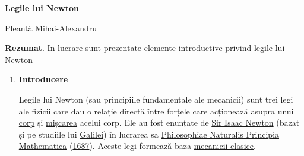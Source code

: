 \documentclass[11pt]{article}
\begin{document}
	
	\begin{center}
	{\large \textbf{Legile lui Newton}}
	\end{center}
	
	
	\begin{center}
	Pleantă Mihai-Alexandru
	\end{center}
	
	
	{\footnotesize \textbf{Rezumat}. In lucrare sunt prezentate elemente introductive privind legile lui Newton}
	
	\begin{enumerate}
		\item \textbf{Introducere}
	
	Legile lui Newton (sau principiile fundamentale ale mecanicii) sunt trei legi ale fizicii care dau o relație directă între forțele care acționează asupra unui \href{https://ro.wikipedia.org/w/index.php?title=Corp_fizic&action=edit&redlink=1}{corp} și \href{https://ro.wikipedia.org/wiki/Mi\%C8\%99care}{mișcarea} acelui corp. Ele au fost enunțate de \href{https://ro.wikipedia.org/wiki/Isaac_Newton}{Sir Isaac Newton} (bazat și pe studiile lui \href{https://ro.wikipedia.org/wiki/Galileo_Galilei}{Galilei}) în lucrarea sa \href{https://ro.wikipedia.org/wiki/Philosophiae_Naturalis_Principia_Mathematica}{Philosophiae Naturalis Principia Mathematica} (\href{https://ro.wikipedia.org/wiki/1687}{1687}). Aceste legi formează baza \href{https://ro.wikipedia.org/wiki/Mecanica_clasic\%C4\%83}{mecanicii clasice}.
	
	\end{enumerate}
	\vspace{1\baselineskip}
\end{document}
